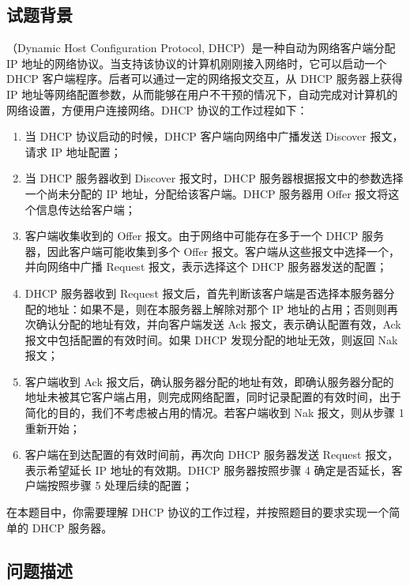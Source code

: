 \subsection*{试题背景}

{}（Dynamic Host Configuration Protocol, DHCP）是一种自动为网络客户端分配 IP 地址的网络协议。当支持该协议的计算机刚刚接入网络时，它可以启动一个 DHCP 客户端程序。后者可以通过一定的网络报文交互，从 DHCP 服务器上获得 IP 地址等网络配置参数，从而能够在用户不干预的情况下，自动完成对计算机的网络设置，方便用户连接网络。DHCP 协议的工作过程如下：

\begin{enumerate}

\item 当 DHCP 协议启动的时候，DHCP 客户端向网络中广播发送 Discover 报文，请求 IP 地址配置；

\item 当 DHCP 服务器收到 Discover 报文时，DHCP 服务器根据报文中的参数选择一个尚未分配的 IP 地址，分配给该客户端。DHCP 服务器用 Offer 报文将这个信息传达给客户端；

\item 客户端收集收到的 Offer 报文。由于网络中可能存在多于一个 DHCP 服务器，因此客户端可能收集到多个 Offer 报文。客户端从这些报文中选择一个，并向网络中广播 Request 报文，表示选择这个 DHCP 服务器发送的配置；

\item DHCP 服务器收到 Request 报文后，首先判断该客户端是否选择本服务器分配的地址：如果不是，则在本服务器上解除对那个 IP 地址的占用；否则则再次确认分配的地址有效，并向客户端发送 Ack 报文，表示确认配置有效，Ack 报文中包括配置的有效时间。如果 DHCP 发现分配的地址无效，则返回 Nak 报文；

\item 客户端收到 Ack 报文后，确认服务器分配的地址有效，即确认服务器分配的地址未被其它客户端占用，则完成网络配置，同时记录配置的有效时间，出于简化的目的，我们不考虑被占用的情况。若客户端收到 Nak 报文，则从步骤 1 重新开始；

\item 客户端在到达配置的有效时间前，再次向 DHCP 服务器发送 Request 报文，表示希望延长 IP 地址的有效期。DHCP 服务器按照步骤 4 确定是否延长，客户端按照步骤 5 处理后续的配置；

\end{enumerate}

在本题目中，你需要理解 DHCP 协议的工作过程，并按照题目的要求实现一个简单的 DHCP 服务器。


\subsection*{问题描述}

